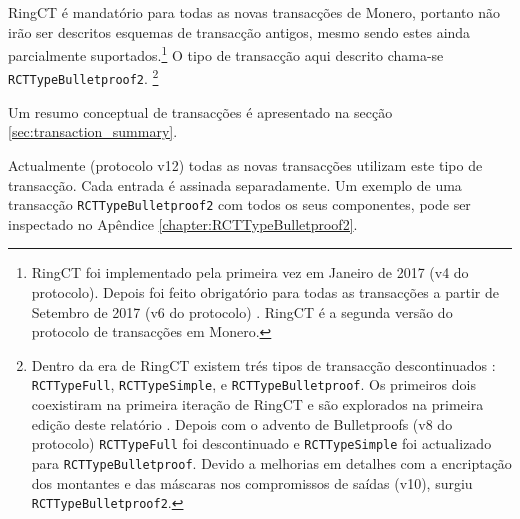 RingCT é mandatório para todas as novas transacções de Monero, portanto não irão ser descritos esquemas de transacção antigos, mesmo sendo estes ainda parcialmente suportados.\footnote{RingCT foi implementado pela primeira vez em Janeiro de 2017 (v4 do protocolo). Depois foi feito obrigatório para todas as transacções a partir de Setembro de 2017 (v6 do protocolo) \cite{ringct-dates}. RingCT é a segunda versão do protocolo de transacções em Monero.}
O tipo de transacção aqui descrito chama-se {\tt RCTTypeBulletproof2}.  
\footnote{Dentro da era de RingCT existem trés tipos de transacção descontinuados : {\tt RCTTypeFull}, {\tt RCTTypeSimple}, e {\tt RCTTypeBulletproof}. Os primeiros dois coexistiram na primeira iteração de RingCT e são explorados na primeira edição deste relatório \cite{ztm-1}. Depois com o advento de Bulletproofs (v8 do protocolo) {\tt RCTTypeFull} foi descontinuado e {\tt RCTTypeSimple} foi actualizado para {\tt RCTTypeBulletproof}. Devido a melhorias em detalhes com a encriptação dos montantes e das máscaras nos compromissos de saídas (v10), surgiu {\tt RCTTypeBulletproof2}.}  

Um resumo conceptual de transacções é apresentado na secção \ref{sec:transaction_summary}.

Actualmente (protocolo v12) todas as novas transacções utilizam este tipo de transacção. Cada entrada é assinada separadamente. Um exemplo de uma transacção {\tt RCTTypeBulletproof2} com todos os seus componentes, pode ser inspectado no Apêndice \ref{chapter:RCTTypeBulletproof2}.

